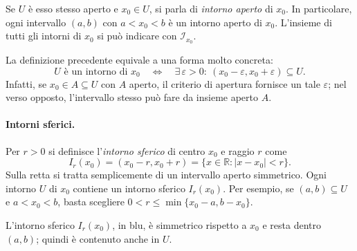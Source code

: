 \documentclass[11pt,a4paper]{article}
\newenvironment{schema}
  {\par\medskip\noindent\begin{minipage}{\linewidth}\centering\small}
  {\end{minipage}\par\medskip}
\newcommand{\R}{\mathbb{R}}
\begin{document}
Se $U$ è esso stesso aperto e $x_0\in U$, si parla di \emph{intorno aperto}
di $x_0$. In particolare, ogni intervallo $(a,b)$ con $a<x_0<b$
è un intorno aperto di $x_0$. L'insieme di tutti gli intorni di $x_0$
si può indicare con $\mathcal I_{x_0}$.

La definizione precedente equivale a una forma molto concreta:
\[
  U\text{ è un intorno di }x_0
  \quad\Longleftrightarrow\quad
  \exists\,\varepsilon>0:\ (x_0-\varepsilon,x_0+\varepsilon)\subseteq U.
\]
Infatti, se $x_0\in A\subseteq U$ con $A$ aperto, il criterio di apertura
fornisce un tale $\varepsilon$; nel verso opposto, l'intervallo stesso
può fare da insieme aperto $A$.

\paragraph{Intorni sferici.}
Per $r>0$ si definisce l'\emph{intorno sferico}
di centro $x_0$ e raggio $r$ come
\[
  I_r(x_0)=(x_0-r,x_0+r)
  =\{x\in\R:|x-x_0|<r\}.
\]
Sulla retta si tratta semplicemente di un intervallo aperto simmetrico.
Ogni intorno $U$ di $x_0$ contiene un intorno sferico $I_r(x_0)$.
Per esempio, se $(a,b)\subseteq U$ e $a<x_0<b$, basta scegliere
$0<r\le\min\{x_0-a,b-x_0\}$.

\begin{schema}
\par\smallskip
L'intorno sferico $I_r(x_0)$, in blu, è simmetrico rispetto a $x_0$
e resta dentro $(a,b)$; quindi è contenuto anche in $U$.
\end{schema}
\end{document}
